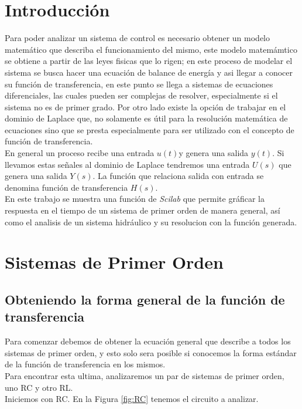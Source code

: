 \documentclass[letterpaper,spanish,12pt]{report}
\begin{document}
\chapter*{Introducci\'on}
Para poder analizar un sistema de control es necesario obtener un modelo matem\'atico que describa el funcionamiento del mismo, este modelo matem\'amtico se obtiene a partir de las leyes fisicas que lo rigen; en este proceso de modelar el sistema se busca hacer una ecuaci\'on de balance de energ\'ia y asi llegar a conocer su funci\'on de transferencia, en este punto se llega a sistemas de ecuaciones diferenciales, las cuales pueden ser complejas de resolver, especialmente si el sistema no es de primer grado. Por otro lado existe la opci\'on de trabajar en el dominio de Laplace que, no solamente es \'util para la resoluci\'on matem\'atica de ecuaciones sino que se presta especialmente para ser utilizado con el concepto de funci\'on de transferencia. \medskip\\En general un proceso recibe una entrada $u(t)$y genera una salida $y(t)$. Si llevamos estas se\~nales al dominio de Laplace tendremos una entrada $U(s)$ que genera una salida $Y(s)$. La funci\'on que relaciona salida con entrada se denomina funci\'on de transferencia $H(s)$. \medskip \\En este trabajo se muestra una funci\'on de \textit{Scilab} que permite gr\'aficar la respuesta en el tiempo de un sistema de primer orden de manera general, as\'i como el analisis de un sistema hidr\'aulico y su resolucion con la funci\'on generada. 

	\renewcommand{\chaptername}{Parte}

	\chapter{Sistemas de Primer Orden}	

	\section{Obteniendo la forma general de la funci\'on de transferencia}

Para comenzar debemos de obtener la ecuaci\'on general que describe a todos los sistemas de primer orden, y esto solo sera posible si conocemos la forma est\'andar de la funci\'on de transferencia en los mismos.\medskip \\Para 		encontrar esta ultima, analizaremos un par de sistemas de primer orden, uno RC y otro RL.\medskip \\Iniciemos con RC. En la Figura \ref{fig:RC} tenemos el circuito a analizar.
\end{document}
